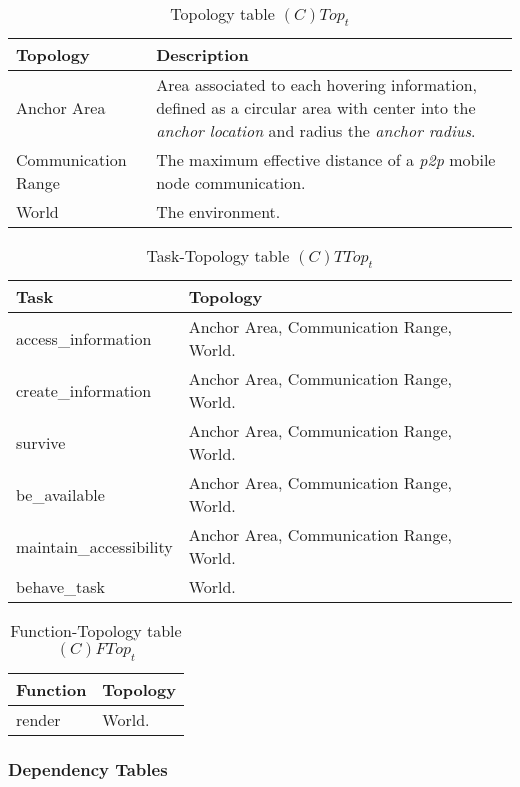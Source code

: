 \begin{table}[H]
	\centering
	\begin{tabular}{|p{4cm}|p{8cm}|}
			\hline
			\textbf{Topology} & \textbf{Description} \\
			\hline
			Anchor Area & Area associated to each hovering information, defined as a
			circular area with center into the \emph{anchor location} and radius the
			\emph{anchor radius}.\\
			\hline
			Communication Range & The maximum effective distance of a \emph{p2p}
			mobile node communication. \\
			\hline
			World & The environment. \\
			\hline
		\end{tabular}
	\caption{Topology table $(C)Top_t$}
	\label{tab:ctopt}
\end{table}

\begin{table}[H]
	\centering
	\begin{tabular}{|p{4cm}|p{8cm}|}
			\hline
			\textbf{Task} & \textbf{Topology} \\
			\hline
			access\_information& Anchor Area, Communication Range, World.\\
			\hline
			create\_information & Anchor Area, Communication Range, World.\\
			\hline
			survive & Anchor Area, Communication Range, World. \\
			\hline
			be\_available & Anchor Area, Communication Range, World. \\
			\hline
			maintain\_accessibility & Anchor Area, Communication Range, World. \\
			\hline
			behave\_task & World. \\
			\hline
		\end{tabular}
		\caption{Task-Topology table $(C)TTop_t$}
	\label{tab:cttopt}
\end{table}

\begin{table}[H]
	\centering
	\begin{tabular}{|p{4cm}|p{8cm}|}
			\hline
			\textbf{Function} & \textbf{Topology} \\
			\hline
			render & World.\\
			\hline
		\end{tabular}
	\caption{Function-Topology table $(C)FTop_t$}
	\label{tab:cftopt}
\end{table}


\subsubsection{Dependency Tables}

